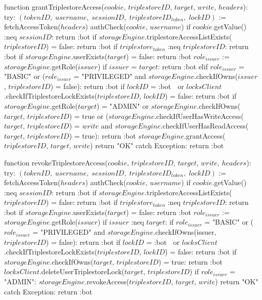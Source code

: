 function grantTriplestoreAccess($cookie$, $triplestoreID$, $target$, $write$, $headers$):
    try:
        $(tokenID, \; username, \; sessionID, \; triplestoreID_{token}, \; lockID)$ := fetchAccessToken($headers$)
        authCheck($cookie$, $username$)
        if $cookie$.getValue() :neq $sessionID$: 
            return :bot
        if $storageEngine$.triplestoreAccessListExists($triplestoreID$) = false:
            return :bot
        if $triplestore_{token}$ :neq $triplestoreID$:
            return :bot
        if $storageEngine$.userExists($target$) = false:
            return :bot
        $role_{issuer}$ := $storageEngine$.getRole($issuer$)
        if $issuer$ = $target$:
            return :bot
        elif $role_{issuer}$ = "BASIC" or ($role_{issuer}$ = "PRIVILEGED" and $storageEngine$.checkIfOwns($issuer$, $triplestoreID$) = false):
            return :bot
        if $lockID$ = :bot $\;$ or $locksClient$.checkIfTriplestoreLockExists($triplestoreID$, $lockID$) = false:
            return :bot
        if $storageEngine$.getRole($target$) = "ADMIN" or $storageEngine$.checkIfOwns($target$, $triplestoreID$) = true or ($storageEngine$.checkIfUserHasWriteAccess($target$, $triplestoreID$) = $write$ and $storageEngine$.checkIfUserHasReadAccess($target$, $triplestoreID$) = true):
            return :bot
        $storageEngine$.grantAccess($triplestoreID$, $target$, $write$)
        return "OK"
    catch Exception: 
       return :bot

function revokeTriplestoreAccess($cookie$, $triplestoreID$, $target$, $write$, $headers$):
    try:
        $(tokenID, \; username, \; sessionID, \; triplestoreID_{token}, \; lockID)$ := fetchAccessToken($headers$)
        authCheck($cookie$, $username$)
        if $cookie$.getValue() :neq $sessionID$: 
            return :bot
        if $storageEngine$.triplestoreAccessListExists($triplestoreID$) = false:
            return :bot
        if $triplestore_{token}$ :neq $triplestoreID$:
            return :bot
        if $storageEngine$.userExists($target$) = false:
            return :bot
        $role_{issuer}$ := $storageEngine$.getRole($issuer$)
        if $issuer$ :neq $target$:
            if $role_{issuer}$ = "BASIC" or ($role_{issuer}$ = "PRIVILEGED" and $storageEngine$.checkIfOwns(issuer, $triplestoreID$) = false):
                return :bot
        if $lockID$ = :bot $\;$ or $locksClient$.checkIfTriplestoreLockExists($triplestoreID$, $lockID$) = false:
            return :bot
        if $storageEngine$.checkIfOwns($target$, $triplestoreID$) = true:
            return :bot
        $locksClient$.deleteUserTriplestoreLock($target$, $triplestoreID$)
        if $role_{issuer}$ = "ADMIN":
            $storageEngine$.revokeAccess($triplestoreID$, $target$, $write$)
        return "OK"
    catch Exception: 
       return :bot

